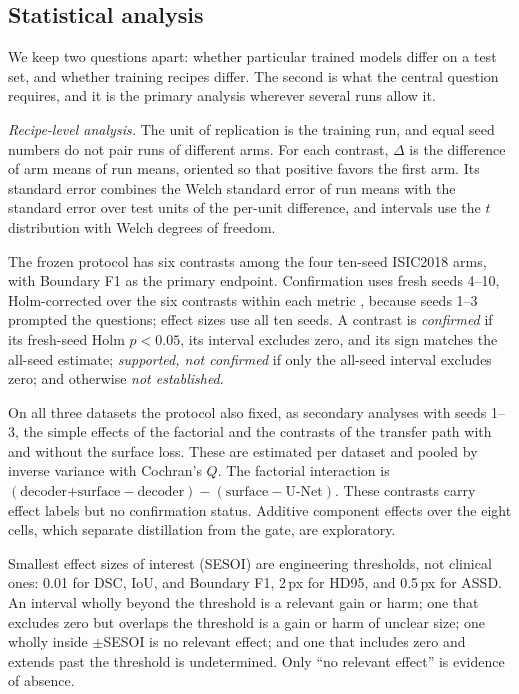 \documentclass[fleqn,10pt,lineno]{wlpeerj}
\begin{document}
\subsection*{Statistical analysis}
We keep two questions apart: whether particular trained models differ on a test set, and whether training recipes differ. The second is what the central question requires, and it is the primary analysis wherever several runs allow it.

\emph{Recipe-level analysis.} The unit of replication is the training run, and equal seed numbers do not pair runs of different arms. For each contrast, $\Delta$ is the difference of arm means of run means, oriented so that positive favors the first arm. Its standard error combines the Welch standard error of run means with the standard error over test units of the per-unit difference, and intervals use the $t$ distribution with Welch degrees of freedom.

The frozen protocol has six contrasts among the four ten-seed ISIC2018 arms, with Boundary F1 as the primary endpoint. Confirmation uses fresh seeds 4--10, Holm-corrected over the six contrasts within each metric \citep{Holm1979A}, because seeds 1--3 prompted the questions; effect sizes use all ten seeds. A contrast is \emph{confirmed} if its fresh-seed Holm $p<0.05$, its interval excludes zero, and its sign matches the all-seed estimate; \emph{supported, not confirmed} if only the all-seed interval excludes zero; and otherwise \emph{not established}.

On all three datasets the protocol also fixed, as secondary analyses with seeds 1--3, the simple effects of the factorial and the contrasts of the transfer path with and without the surface loss. These are estimated per dataset and pooled by inverse variance with Cochran's $Q$. The factorial interaction is $(\text{decoder+surface}-\text{decoder})-(\text{surface}-\text{U-Net})$. These contrasts carry effect labels but no confirmation status. Additive component effects over the eight cells, which separate distillation from the gate, are exploratory.

Smallest effect sizes of interest (SESOI) are engineering thresholds, not clinical ones: 0.01 for DSC, IoU, and Boundary F1, 2\,px for HD95, and 0.5\,px for ASSD. An interval wholly beyond the threshold is a relevant gain or harm; one that excludes zero but overlaps the threshold is a gain or harm of unclear size; one wholly inside $\pm$SESOI is no relevant effect; and one that includes zero and extends past the threshold is undetermined. Only ``no relevant effect'' is evidence of absence.
\end{document}
